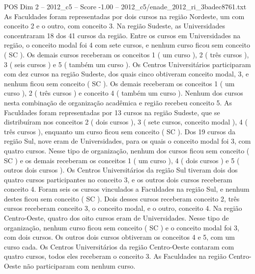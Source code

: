 \begin{textsample}{POS Dim 2 – 2012\_c5 – Score -1.00 – 2012\_c5/enade\_2012\_ri\_3badec8761.txt}
As Faculdades foram representadas por dois cursos na região Nordeste, um com conceito 2 e o outro, com conceito 3.
Na região Sudeste, as Universidades concentraram 18 dos 41 cursos da região.
Entre os cursos em Universidades na região, o conceito modal foi 4 com sete cursos, e nenhum curso ficou sem conceito ( SC ).
Os demais cursos receberam os conceitos 1 ( um curso ), 2 ( três cursos ), 3 ( seis cursos ) e 5 ( também um curso ).
Os Centros Universitários participaram com dez cursos na região Sudeste, dos quais cinco obtiveram conceito modal, 3, e nenhum ficou sem conceito ( SC ).
Os demais receberam os conceitos 1 ( um curso ), 2 ( três cursos ) e conceito 4 ( também um curso ).
Nenhum dos cursos nesta combinação de organização acadêmica e região recebeu conceito 5.
As Faculdades foram representadas por 13 cursos na região Sudeste, que se distribuíram nos conceitos 2 ( dois cursos ), 3 ( sete cursos, conceito modal ), 4 ( três cursos ), enquanto um curso ficou sem conceito ( SC ).
Dos 19 cursos da região Sul, nove eram de Universidades, para os quais o conceito modal foi 3, com quatro cursos.
Nesse tipo de organização, nenhum dos cursos ficou sem conceito ( SC ) e os demais receberam os conceitos 1 ( um curso ), 4 ( dois cursos ) e 5 ( outros dois cursos ).
Os Centros Universitários da região Sul tiveram dois dos quatro cursos participantes no conceito 3, e os outros dois cursos receberam conceito 4.
Foram seis os cursos vinculados a Faculdades na região Sul, e nenhum destes ficou sem conceito ( SC ).
Dois desses cursos receberam conceito 2, três cursos receberam conceito 3, o conceito modal, e o outro, conceito 4.
Na região Centro-Oeste, quatro dos oito cursos eram de Universidades.
Nesse tipo de organização, nenhum curso ficou sem conceito ( SC ) e o conceito modal foi 3, com dois cursos.
Os outros dois cursos obtiveram os conceitos 4 e 5, com um curso cada.
Os Centros Universitários da região Centro-Oeste contaram com quatro cursos, todos eles receberam o conceito 3.
As Faculdades na região Centro-Oeste não participaram com nenhum curso.

\end{textsample}
